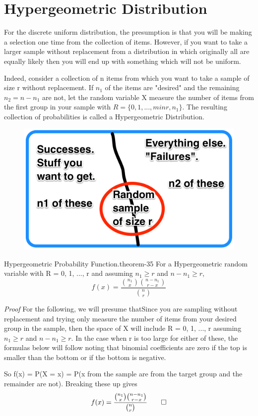 \documentclass[10pt,]{book}
\makeatletter
\renewcommand*{\proofname}{Proof}
\renewenvironment{proof}[1][\proofname]{\par
  \pushQED{\qed}%
  \normalfont \topsep6\p@\@plus6\p@\relax
  \trivlist
  \item\relax
    {\itshape
    #1\@addpunct{.}}\hspace\labelsep\ignorespaces
}{%
  \popQED\endtrivlist\@endpefalse
}
\numberwithin{equation}{section}
\makeatother
\begin{document}
\section[{Hypergeometric Distribution}]{Hypergeometric Distribution}\label{section-42}
\hypertarget{p-826}{}%
For the discrete uniform distribution, the presumption is that you will be making a selection one time from the collection of items. However, if you want to take a larger sample without replacement from a distribution in which originally all are equally likely then you will end up with something which will not be uniform.%
\par
\hypertarget{p-827}{}%
Indeed, consider a collection of n items from which you want to take a sample of size r without replacement. If \(n_1\) of the items are "desired" and the remaining \(n_2 = n - n_1\) are not, let the random variable X measure the number of items from the first group in your sample with \(R = \{0, 1, ..., min {r,n_1} \}\). The resulting collection of probabilities is called a Hypergeometric Distribution.%
\par
\hypertarget{p-828}{}%
\begin{figure}\centering\includegraphics[width=0.6\linewidth]{images/HypergeometricBucket.png}
\end{figure}%
\par
\hypertarget{p-829}{}%
\begin{theorem}{Hypergeometric Probability Function.}{}{theorem-35}%
\hypertarget{HypergeometricFunction}{}%
For a Hypergeometric random variable with R = {0, 1, ..., r} and assuming \(n_1 \ge r\) and \(n-n_1 \ge r\),%
\begin{equation*}
f(x) = \frac{\binom{n_1}{x} \binom{n-n_1}{r-x}}{\binom{n}{r}}
\end{equation*}
%
\end{theorem}
\begin{proof}\hypertarget{proof-37}{}
\hypertarget{p-831}{}%
For the following, we will presume thatSince you are sampling without replacement and trying only measure the number of items from your desired group in the sample, then the space of X will include R = {0, 1, ..., r} assuming \(n_1 \ge r\) and \(n-n_1 \ge r\). In the case when r is too large for either of these, the formulas below will follow noting that binomial coefficients are zero if the top is smaller than the bottom or if the bottom is negative.%
\par
\hypertarget{p-832}{}%
So f(x) = P(X = x) = P(x from the sample are from the target group and the remainder are not). Breaking these up gives%
\begin{equation*}
f(x) = \frac{\binom{n_1}{x} \binom{n-n_1}{r-x}}{\binom{n}{r}}\qedhere
\end{equation*}
%
\end{proof}
\end{document}
